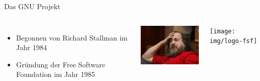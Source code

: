 \documentclass[12pt]{beamer}
\begin{document}
\begin{frame}{Das GNU Projekt}
  \begin{columns}
    \column{6cm}

    \begin{itemize}
      \item Begonnen von Richard Stallman im Jahr 1984 
      \item Gründung der Free Software Foundation im Jahr 1985 
    \end{itemize}

    \column{7cm}

    \begin{center}
      \includegraphics[width=4.5cm]{img/stallman}
    \par\end{center}

    \begin{center}
      \texttt{[image: img/logo-fsf]}
    \par\end{center}
  \end{columns}
\end{frame}
\end{document}
